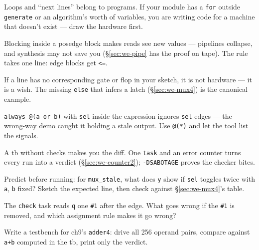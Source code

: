 \begin{tripwire}
Loops and ``next lines'' belong to programs. If your module has a
\texttt{for} outside \texttt{generate} or an algorithm's worth of
variables, you are writing code for a machine that doesn't exist ---
draw the hardware first.
\end{tripwire}
\begin{tripwire}[\texttt{=} where \texttt{<=} belongs]
Blocking inside a posedge block makes reads see new values ---
pipelines collapse, and synthesis may not save you
(\S\ref{sec:we-pipe} has the proof on tape). The rule takes one line:
edge blocks get \texttt{<=}.
\end{tripwire}
\begin{tripwire}
If a line has no corresponding gate or flop in your sketch, it is not
hardware --- it is a wish. The missing \texttt{else} that infers a
latch (\S\ref{sec:we-mux4}) is the canonical example.
\end{tripwire}
\begin{tripwire}
\texttt{always @(a or b)} with \texttt{sel} inside the expression
ignores \texttt{sel} edges --- the wrong-way demo caught it holding a
stale output. Use \texttt{@(*)} and let the tool list the signals.
\end{tripwire}
\begin{tripwire}
A tb without checks makes you the diff. One \texttt{task} and an error
counter turns every run into a verdict
(\S\ref{sec:we-counter2}); \texttt{-DSABOTAGE} proves the checker
bites.
\end{tripwire}

\begin{exercise}[medium]
Predict before running: for \texttt{mux\_stale}, what does \texttt{y}
show if \texttt{sel} toggles twice with \texttt{a}, \texttt{b} fixed?
Sketch the expected line, then check against
\S\ref{sec:we-mux4}'s table.
\end{exercise}

\begin{exercise}[medium]
The \texttt{check} task reads \texttt{q} one \texttt{\#1} after the
edge. What goes wrong if the \texttt{\#1} is removed, and which
assignment rule makes it go wrong?
\end{exercise}

\begin{exercise}[hard]
Write a testbench for ch9's \texttt{adder4}: drive all 256 operand
pairs, compare against \texttt{a+b} computed in the tb, print only the
verdict.
\end{exercise}

